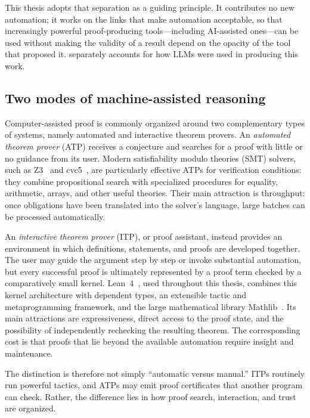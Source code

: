 This thesis adopts that separation as a guiding principle. It contributes no new
automation; it works on the links that make automation acceptable, so that
increasingly powerful proof-producing tools---including AI-assisted ones---can be
used without making the validity of a result depend on the opacity of the tool
that proposed it.  separately accounts for how LLMs were
used in producing this work.

\subsection{Two modes of machine-assisted reasoning}
\label{subsec:intro-itp-atp}

Computer-assisted proof is commonly organized around two complementary types of
systems, namely automated and interactive theorem provers. An \emph{automated theorem prover} (ATP) receives a conjecture and
searches for a proof with little or no guidance from its user. Modern
satisfiability modulo theories (SMT) solvers, such as
Z3~\cite{demoura2008z3} and cvc5~\cite{barbosa2022cvc5}, are particularly
effective ATPs for verification conditions: they combine propositional search
with specialized procedures for equality, arithmetic, arrays, and other useful
theories. Their main attraction is throughput: once obligations have been
translated into the solver's language, large batches can be processed
automatically.

An \emph{interactive theorem prover} (ITP), or proof assistant, instead provides
an environment in which definitions, statements, and proofs are developed
together. The user may guide the argument step by step or invoke substantial
automation, but every successful proof is ultimately represented by a proof term
checked by a comparatively small kernel. Lean~4~\cite{deMouraUllrich2021Lean4},
used throughout this thesis, combines this kernel architecture with dependent
types, an extensible tactic and metaprogramming framework, and the large
mathematical library Mathlib~\cite{mathlib4}. Its main attractions are
expressiveness, direct access to the proof state, and the possibility of
independently rechecking the resulting theorem. The corresponding cost is that
proofs that lie beyond the available automation require insight and
maintenance.

The distinction is therefore not simply ``automatic versus manual.'' ITPs
routinely run powerful tactics, and ATPs may emit proof certificates that
another program can check. Rather, the difference lies in how proof search,
interaction, and trust are organized.

